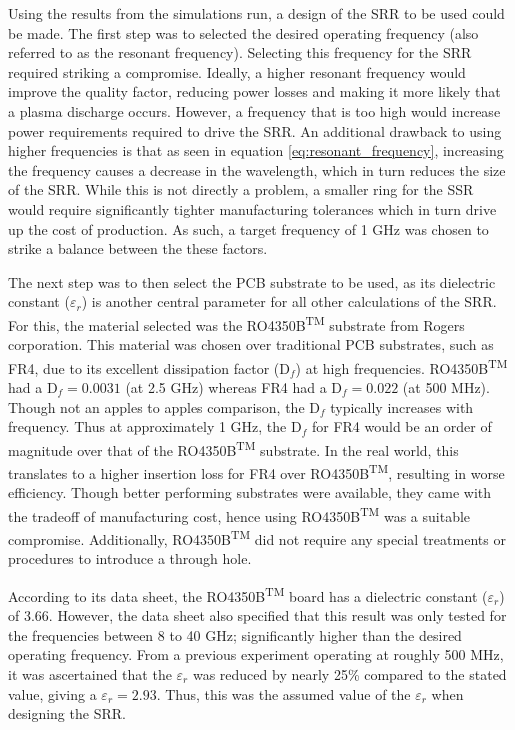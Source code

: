 Using the results from the simulations run, a design of the SRR to be used could be made. The first step was to selected the desired operating frequency (also referred to as the resonant frequency). Selecting this frequency for the SRR required striking a compromise. Ideally, a higher resonant frequency would improve the quality factor, reducing power losses and making it more likely that a plasma discharge occurs. However, a frequency that is too high would increase power requirements required to drive the SRR. An additional drawback to using higher frequencies is that as seen in equation \ref{eq:resonant_frequency}, increasing the frequency causes a decrease in the wavelength, which in turn reduces the size of the SRR. While this is not directly a problem, a smaller ring for the SSR would require significantly tighter manufacturing tolerances which in turn drive up the cost of production. As such, a target frequency of 1 GHz was chosen to strike a balance between the these factors. 


The next step was to then select the PCB substrate to be used, as its dielectric constant ($\varepsilon_r$) is another central parameter for all other calculations of the SRR. For this, the material selected was the RO4350B\textsuperscript{TM} substrate from Rogers corporation. This material was chosen over traditional PCB substrates, such as FR4, due to its excellent dissipation factor (D$_f$) at high frequencies. RO4350B\textsuperscript{TM} had a D$_f = 0.0031$ (at 2.5 GHz) whereas FR4 had a D$_f = 0.022$ (at 500 MHz). Though not an apples to apples comparison, the D$_f$ typically increases with frequency. Thus at approximately 1 GHz, the D$_f$ for FR4 would be an order of magnitude over that of the RO4350B\textsuperscript{TM} substrate. In the real world, this translates to a higher insertion loss for FR4 over RO4350B\textsuperscript{TM}, resulting in worse efficiency. Though better performing substrates were available, they came with the tradeoff of manufacturing cost, hence using RO4350B\textsuperscript{TM} was a suitable compromise. Additionally, RO4350B\textsuperscript{TM} did not require any special treatments or procedures to introduce a through hole.

According to its data sheet, the RO4350B\textsuperscript{TM} board has a dielectric constant ($\varepsilon_r$) of 3.66. However, the data sheet also specified that this result was only tested for the frequencies between 8 to 40 GHz; significantly higher than the desired operating frequency. From a previous experiment operating at roughly 500 MHz, it was ascertained that the $\varepsilon_r$ was reduced by nearly 25\% compared to the stated value, giving a $\varepsilon_r = 2.93$. Thus, this was the assumed value of the $\varepsilon_r$ when designing the SRR.

